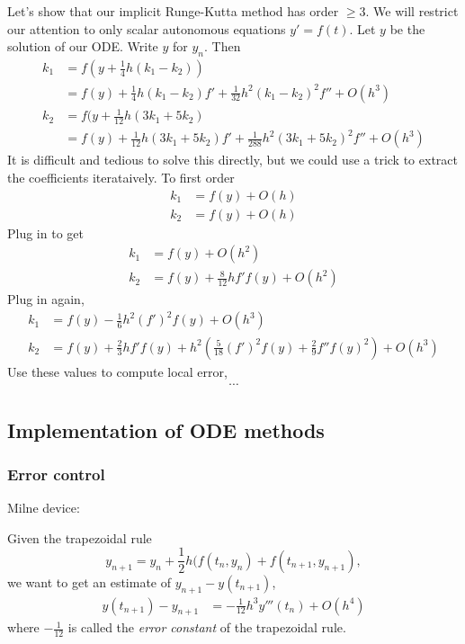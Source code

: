 \documentclass[a4paper]{article}
\begin{document}
Let's show that our implicit Runge-Kutta method has order \(\geq 3\). We will restrict our attention to only scalar autonomous equations \(y' = f(t)\). Let \(y\) be the solution of our ODE. Write \(y\) for \(y_n\). Then
\begin{align*}
  k_1 &= f(y + \frac{1}{4}h(k_1 - k_2)) \\
      &= f(y) + \frac{1}{4}h(k_1 - k_2) f' + \frac{1}{32}h^2(k_1 - k_2)^2 f'' + O(h^3) \\
  k_2 &= f(y + \frac{1}{12}h(3k_1 + 5k_2) \\
      &= f(y) + \frac{1}{12}h(3k_1 + 5k_2)f' + \frac{1}{288}h^2(3k_1 + 5k_2)^2 f'' + O(h^3)
\end{align*}
It is difficult and tedious to solve this directly, but we could use a trick to extract the coefficients iterataively. To first order
\begin{align*}
  k_1 &= f(y) + O(h) \\
  k_2 &= f(y) + O(h)
\end{align*}
Plug in to get
\begin{align*}
  k_1 &= f(y) + O(h^2) \\
  k_2 &= f(y) + \frac{8}{12}h f'f(y) + O(h^2)
\end{align*}
Plug in again,
\begin{align*}
  k_1 &= f(y) - \frac{1}{6}h^2 (f')^2f(y) + O(h^3) \\
  k_2 &= f(y) + \frac{2}{3}h f' f(y) + h^2(\frac{5}{18} (f')^2 f(y) + \frac{2}{9} f'' f(y)^2) + O(h^3)
\end{align*}
Use these values to compute local error,
\begin{align*}
  \cdots
\end{align*}

\blindtext

\subsection{Implementation of ODE methods}

\subsubsection{Error control}

Milne device:

Given the trapezoidal rule
\[
  y_{n + 1} = y_n + \frac{1}{2}h(f(t_n, y_n) + f(t_{n + 1}, y_{n + 1}),
\]
we want to get an estimate of \(y_{n + 1} - y(t_{n + 1})\),
\begin{align*}
  y(t_{n + 1}) - y_{n + 1}
  &= -\frac{1}{12}h^3y'''(t_n) + O(h^4)
\end{align*}
where \(-\frac{1}{12}\) is called the \emph{error constant} of the trapezoidal rule.
\end{document}
